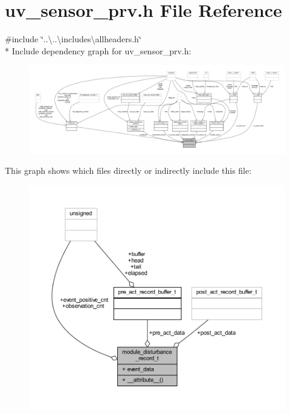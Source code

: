 \hypertarget{a00035}{\section{uv\+\_\+sensor\+\_\+prv.\+h File Reference}
\label{a00035}
}
{\ttfamily \#include \char`\"{}..\textbackslash{}..\textbackslash{}includes\textbackslash{}allheaders.\+h\char`\"{}}\\*
Include dependency graph for uv\+\_\+sensor\+\_\+prv.\+h\+:\nopagebreak
\begin{figure}[H]
\begin{center}
\leavevmode
\includegraphics[width=350pt]{d4/df6/a01716}
\end{center}
\end{figure}
This graph shows which files directly or indirectly include this file\+:\nopagebreak
\begin{figure}[H]
\begin{center}
\leavevmode
\includegraphics[width=350pt]{dd/ddb/a01717}
\end{center}
\end{figure}

